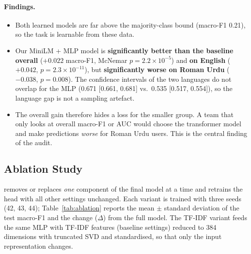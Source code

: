 \documentclass[11pt,a4paper]{article}
\begin{document}
\paragraph{Findings.}
\begin{itemize}
  \item Both learned models are far above the majority-class bound (macro-F1 0.21), so the
        task is learnable from these data.
  \item Our MiniLM + MLP model is \textbf{significantly better than the baseline overall}
        ($+0.022$ macro-F1, McNemar $p = 2.2\times10^{-5}$) and \textbf{on English}
        ($+0.042$, $p = 2.3\times10^{-11}$), but \textbf{significantly worse on Roman Urdu}
        ($-0.038$, $p = 0.008$). The confidence intervals of the two languages do not overlap
        for the MLP (0.671 [0.661, 0.681] vs.\ 0.535 [0.517, 0.554]), so the language gap is
        not a sampling artefact.
  \item The overall gain therefore hides a loss for the smaller group. A team that only looks at
        overall macro-F1 or AUC would choose the transformer model and make predictions
        \emph{worse} for Roman Urdu users. This is the central finding of the audit.
\end{itemize}

\subsection{Ablation Study}
 removes or replaces \emph{one} component of the final model at a time and
retrains the head with all other settings unchanged. Each variant is trained with three seeds
(42, 43, 44); Table~\ref{tab:ablation} reports the mean $\pm$ standard deviation of the test
macro-F1 and the change ($\Delta$) from the full model. The TF-IDF variant feeds the same MLP
with TF-IDF features (baseline settings) reduced to 384 dimensions with truncated SVD and
standardised, so that only the input representation changes.
\end{document}
